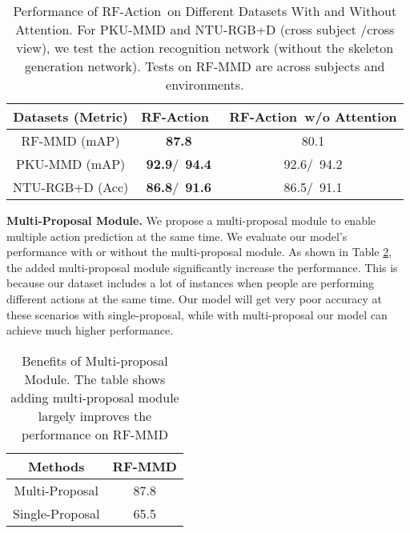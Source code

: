\documentclass[10pt,twocolumn,letterpaper]{article}
\newcommand{\name} {RF-Action}
\begin{document}
\begin{table}[htbp]
  \small
    \centering
    \vspace{-5pt}
     \begin{tabular}{ccc}
         \hline
        Datasets (Metric)& \name\ & \name\ w/o Attention \\
         \hline
         RF-MMD (mAP) & \textbf{87.8} & 80.1 \\
        PKU-MMD (mAP) & \textbf{92.9}/~\textbf{94.4} & 92.6/~94.2 \\
        NTU-RGB+D (Acc) & \textbf{86.8}/~\textbf{91.6} & 86.5/~91.1 \\
         \hline
     \end{tabular}
  \vspace{-10pt}
      \caption{\footnotesize{Performance of \name\ on Different Datasets With and Without Attention. For PKU-MMD and NTU-RGB+D (cross subject /cross view), we test the action recognition network (without the skeleton generation network). Tests on RF-MMD are across subjects and environments. }}
        \vspace{-10pt}
  \label{tab:ap_attention}
\end{table}

\vskip  0.06in \noindent
\textbf{Multi-Proposal Module.}
We propose a multi-proposal module to enable multiple action prediction at the same time. We evaluate our model's performance with or without the multi-proposal module. As shown in Table \ref{tab:ap_multi_proposal}, the added multi-proposal module significantly increase the performance. This is because our dataset includes a lot of instances when people are performing different actions at the same time. Our model will get very poor accuracy at these scenarios with single-proposal, while with multi-proposal our model can achieve much higher performance.

\begin{table}[htbp]
  \small
    \centering
    \begin{tabular}{cc}
        \hline
        Methods & RF-MMD \\
        \hline
        Multi-Proposal & 87.8 \\
        Single-Proposal & 65.5 \\
        \hline
    \end{tabular}
  \vspace{-10pt}
      \caption{\footnotesize{Benefits of Multi-proposal Module. The table shows adding multi-proposal module largely improves the performance on RF-MMD}}
        \vspace{-5pt}
  \label{tab:ap_multi_proposal}
\end{table}
\end{document}
